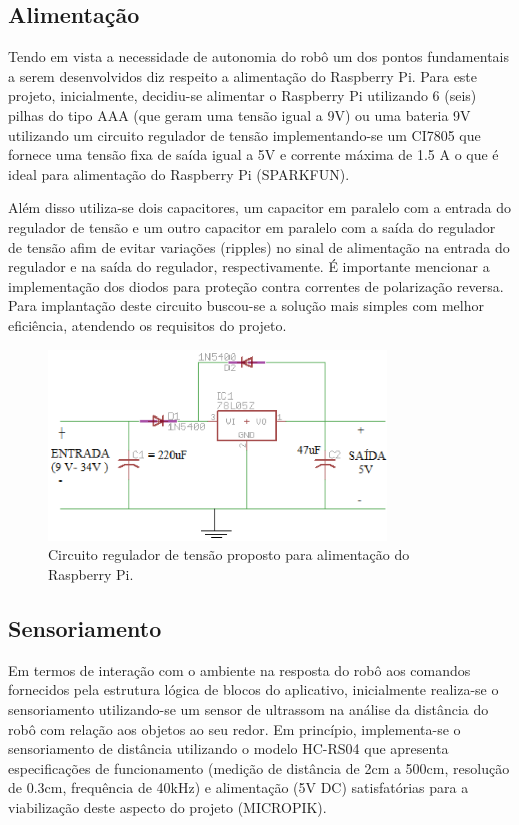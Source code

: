 \subsection{Alimentação}

Tendo em vista a necessidade de autonomia do robô um dos pontos fundamentais a serem desenvolvidos diz respeito a alimentação do Raspberry Pi. Para este projeto, inicialmente, decidiu-se alimentar o Raspberry Pi utilizando 6 (seis) pilhas do tipo AAA (que geram uma tensão igual a 9V) ou uma bateria 9V utilizando um circuito regulador de tensão implementando-se um CI7805 que fornece uma tensão fixa de saída igual a 5V e corrente máxima de 1.5 A o que é ideal para alimentação do Raspberry Pi (SPARKFUN).

Além disso utiliza-se dois capacitores, um capacitor em paralelo com a entrada do regulador de tensão e um outro capacitor em paralelo com a saída do regulador de tensão afim de evitar variações (ripples) no sinal de alimentação na entrada do regulador e na saída do regulador, respectivamente. É importante mencionar a implementação dos diodos para proteção contra correntes de polarização reversa. Para implantação deste circuito buscou-se a solução mais simples com melhor eficiência, atendendo os requisitos do projeto.

\begin{figure}[H]
    \centering
    \includegraphics[width=0.8\textwidth]{figuras/esquematico_regulador.eps}
    \caption{Circuito regulador de tensão proposto para alimentação do Raspberry Pi.}
    \label{fig:catia01}
\end{figure}

\subsection{Sensoriamento}

Em termos de interação com o ambiente na resposta do robô aos comandos fornecidos pela estrutura lógica de blocos do aplicativo, inicialmente realiza-se o sensoriamento utilizando-se um sensor de ultrassom na análise da distância do robô com relação aos objetos ao seu redor. Em princípio, implementa-se o sensoriamento de distância utilizando o modelo HC-RS04 que apresenta especificações de funcionamento (medição de distância de 2cm a 500cm, resolução de 0.3cm, frequência de 40kHz) e alimentação (5V DC) satisfatórias para a viabilização deste aspecto do projeto (MICROPIK).

